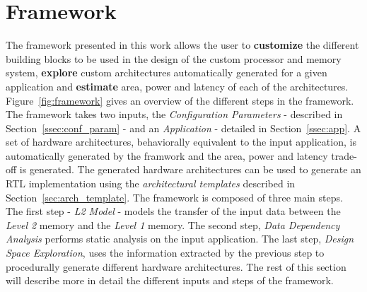\section{Framework}
\label{sec:framework}
The framework presented in this work allows the user to \textbf{customize} the different building blocks to be used in the design of the custom processor and memory system, \textbf{explore} custom architectures automatically generated for a given application and \textbf{estimate} area, power and latency of each of the architectures. Figure~\ref{fig:framework} gives an overview of the different steps in the framework. The framework takes two inputs, the \textit{Configuration Parameters} - described in Section~\ref{ssec:conf_param} - and an \textit{Application} - detailed in Section~\ref{ssec:app}. A set of hardware architectures, behaviorally equivalent to the input application, is automatically generated by the framwork and the area, power and latency trade-off is generated. The generated hardware architectures can be used to generate an RTL implementation using the \textit{architectural templates} described in Section~\ref{sec:arch_template}.
The framework is composed of three main steps. The first step - \textit{L2 Model} - models the transfer of the input data between the \textit{Level 2} memory and the \textit{Level 1} memory. The second step, \textit{Data Dependency Analysis} performs static analysis on the input application. The last step, \textit{Design Space Exploration}, uses the information extracted by the previous step to procedurally generate different hardware architectures.
The rest of this section will describe more in detail the different inputs and steps of the framework.



%

